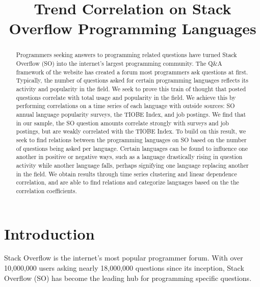 \documentclass[conference]{IEEEtran}
\begin{document}
\title{Trend Correlation on Stack Overflow Programming Languages}

\author{
\and
{}
}

\maketitle

\begin{abstract}
Programmers seeking answers to programming related questions have turned Stack Overflow (SO) into the internet's largest programming community. The Q\&A framework of the website has created a forum most programmers ask questions at first. Typically, the number of questions asked for certain programming languages reflects its activity and popularity in the field. We seek to prove this train of thought that posted questions correlate with total usage and popularity in the field. We achieve this by performing correlations on a time series of each language with outside sources: SO annual language popularity surveys, the TIOBE Index, and job postings. We find that in our sample, the SO question amounts correlate strongly with surveys and job postings, but are weakly correlated with the TIOBE Index. To build on this result, we seek to find relations between the programming languages on SO based on the number of questions being asked per language. Certain languages can be found to influence one another in positive or negative ways, such as a language drastically rising in question activity while another language falls, perhaps signifying one language replacing another in the field. We obtain results through time series clustering and linear dependence correlation, and are able to find relations and categorize languages based on the the correlation coefficients.
\end{abstract}


\section{Introduction}
Stack Overflow is the internet's most popular programmer forum. With over 10,000,000 users asking nearly 18,000,000 questions since its inception, Stack Overflow (SO) has become the leading hub for programming specific questions.
\end{document}
